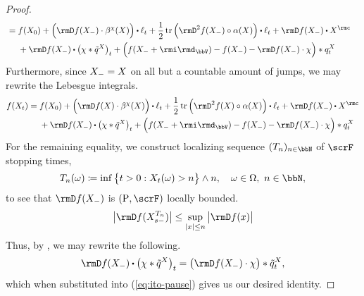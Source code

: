 \begin{proof}
\begin{align*}
    &= \begin{aligned}[t]
      &f(\X_0) + \Big( \Der f(\X_-) \cdot \affDrift^\trunc(\X) \Big) \shortInt \leb_t + \frac12 \tr\Big( \Hess f(\X_-) \circ \affDiff(\X) \Big)  \shortInt \leb_t + \Der f(\X_-) \shortInt \X^\rmc \\
      &+ \Der f(\X_-) \shortInt \big( \trunc \ast \compensate{\jumpMeas^\X} \big)_t + \Big( f(\X_-+\id_\vecSpace) - f(\X_-) - \Der f(\X_-) \cdot \trunc \Big) \ast \jumpMeas^\X_t
    \end{aligned}
  \end{align*}
  Furthermore, since $X_- = X$ on all but a countable amount of jumps, we may rewrite the Lebesgue integrals.
  \begin{equation}
    \label{eq:ito-pause}
    f(\X_t)
    = \begin{aligned}[t]
      &f(\X_0) + \Big( \Der f(\X) \cdot \affDrift^\trunc(\X) \Big) \shortInt \leb_t + \frac12 \tr\Big( \Hess f(\X) \circ \affDiff(\X) \Big)  \shortInt \leb_t + \Der f(\X_-) \shortInt \X^\rmc \\
      &+ \Der f(\X_-) \shortInt \big( \trunc \ast \compensate{\jumpMeas^\X} \big)_t + \Big( f(\X_-+\id_\vecSpace) - f(\X_-) - \Der f(\X_-) \cdot \trunc \Big) \ast \jumpMeas^\X_t
    \end{aligned}
  \end{equation}
  For the remaining equality, we construct localizing sequence $(T_n)_{n\in\bbN}$ of $\scrF$ stopping times,
  \begin{equation}
    \label{eq:stopping-times}
    T_n(\omega) \defeq \inf \big\{ t > 0 : \X_t(\omega) > n \big\} \wedge n, \quad \omega \in \Omega, ~ n \in \bbN,
  \end{equation}
  to see that $\Der f(\X_-)$ is $(\Prb, \scrF)$ locally bounded.
  \begin{equation*}
    \big|\Der f(\X^{T_n}_{s-})\big| \leq \sup_{|\stateVar| \leq n} \big| \Der f(\stateVar) \big|
  \end{equation*}
  Thus, by \cite[Proposition II.1.30]{jacod2003}, we may rewrite the following.
  \begin{equation*}
    \Der f(\X_-) \shortInt \big( \trunc \ast \compensate{\jumpMeas^\X} \big)_t 
    = \big( \Der f(\X_-) \cdot \trunc \big) \ast \compensate{\jumpMeas^\X}_t ,
  \end{equation*}
  which when substituted into (\ref{eq:ito-pause}) gives us our desired identity.
\end{proof}

